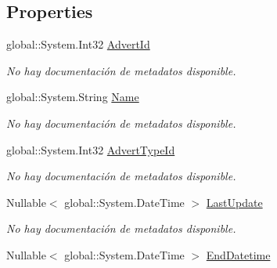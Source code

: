 \subsection*{Properties}
\begin{DoxyCompactItemize}
\item 
global\-::\-System.\-Int32 \hyperlink{class_microsoft_1_1_samples_1_1_kinect_1_1_basic_interactions_1_1_adverts_a815d0ab21529092ceea4fb9e6d5c8690}{Advert\-Id}
\begin{DoxyCompactList}\small\item\em No hay documentación de metadatos disponible. \end{DoxyCompactList}\item 
global\-::\-System.\-String \hyperlink{class_microsoft_1_1_samples_1_1_kinect_1_1_basic_interactions_1_1_adverts_ade56db6e7a214151a3724dc147dda366}{Name}
\begin{DoxyCompactList}\small\item\em No hay documentación de metadatos disponible. \end{DoxyCompactList}\item 
global\-::\-System.\-Int32 \hyperlink{class_microsoft_1_1_samples_1_1_kinect_1_1_basic_interactions_1_1_adverts_a0a934082d644b38254abe867e9ed1352}{Advert\-Type\-Id}
\begin{DoxyCompactList}\small\item\em No hay documentación de metadatos disponible. \end{DoxyCompactList}\item 
Nullable$<$ global\-::\-System.\-Date\-Time $>$ \hyperlink{class_microsoft_1_1_samples_1_1_kinect_1_1_basic_interactions_1_1_adverts_a15fd8b003d880267cc1c3b6eee837e9e}{Last\-Update}
\begin{DoxyCompactList}\small\item\em No hay documentación de metadatos disponible. \end{DoxyCompactList}\item 
Nullable$<$ global\-::\-System.\-Date\-Time $>$ \hyperlink{class_microsoft_1_1_samples_1_1_kinect_1_1_basic_interactions_1_1_adverts_ad5455b14c195bcf81ac48fa180a1aacb}{End\-Datetime}

\end{DoxyCompactItemize}

